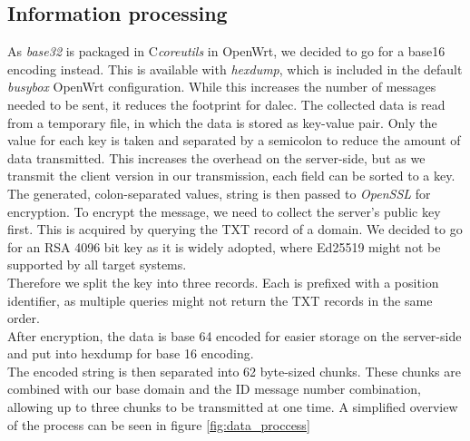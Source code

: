      
% 
\subsection{Information processing}

    As \textit{base32} is packaged in C\textit{coreutils} in OpenWrt, we decided to go for a base16 encoding instead. This is available with \textit{hexdump}, which is included in the default \textit{busybox} OpenWrt configuration. While this increases the number of messages needed to be sent, it reduces the footprint for dalec. The collected data is read from a temporary file, in which the data is stored as key-value pair. Only the value for each key is taken and separated by a semicolon to reduce the amount of data transmitted. This increases the overhead on the server-side, but as we transmit the client version in our transmission, each field can be sorted to a key.\\
    The generated, colon-separated values, string is then passed to \textit{OpenSSL} for encryption. To encrypt the message, we need to collect the server's public key first.
    This is acquired by querying the TXT record of a domain. We decided to go for an RSA 4096 bit key as it is widely adopted, where Ed25519 might not be supported by all target systems.\\
    Therefore we split the key into three records. Each is prefixed with a position identifier, as multiple queries might not return the TXT records in the same order.\\
    After encryption, the data is base 64 encoded for easier storage on the server-side and put into hexdump for base 16 encoding.\\
    The encoded string is then separated into 62 byte-sized chunks. These chunks are combined with our base domain and the ID message number combination, allowing up to three chunks to be transmitted at one time. A simplified overview of the process can be seen in figure \ref{fig:data_proccess}\\
    
    \newpage
    

